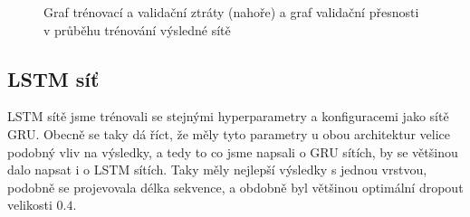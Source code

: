 \begin{figure}[] %
    \centering
    \caption{Graf trénovací a validační ztráty (nahoře) a graf validační přesnosti v průběhu trénování výsledné sítě}
    \label{graph:gru}
\end{figure}

\subsection{LSTM síť}

LSTM sítě jsme trénovali se stejnými hyperparametry a konfiguracemi jako sítě
GRU. Obecně se taky dá říct, že měly tyto parametry u obou architektur velice
podobný vliv na výsledky, a tedy to co jsme napsali o GRU sítích, by se většinou
dalo napsat i o LSTM sítích. Taky měly nejlepší výsledky s jednou vrstvou,
podobně se projevovala délka sekvence, a obdobně byl většinou optimální
dropout velikosti $0.4$.

